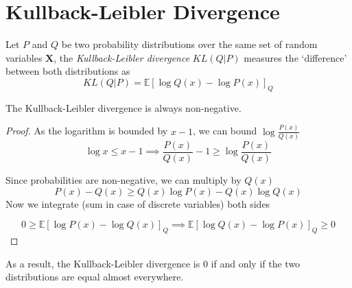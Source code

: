\section{Kullback-Leibler Divergence}

\begin{definition}
  Let \(P\) and \(Q\) be two probability distributions over the same set of
  random variables \(\bm{X}\), the \emph{Kullback-Leibler divergence}
  \(KL(Q|P)\) measures the `difference' between both distributions as
  \[
    KL(Q|P) = \mathbb{E}[\log Q(x) - \log P(x)]_Q
  \]
\end{definition}

\begin{proposition}
The Kullback-Leibler divergence is always non-negative.
\end{proposition}
\begin{proof}
  As the logarithm is bounded by \(x - 1\), we can bound \(\log{\frac{P(x)}{Q(x)}}\)
  \[
    \log{x} \leq x - 1 \implies \frac{P(x)}{Q(x)} - 1 \geq \log{\frac{P(x)}{Q(x)}}
  \]

  Since probabilities are non-negative, we can multiply by \(Q(x)\)
  \[
    P(x) - Q(x) \geq Q(x) \log{P(x)} - Q(x) \log{Q(x)}
  \]
  Now we integrate (sum in case of discrete variables) both sides

  \[
    0 \geq \mathbb{E}[\log{P(x)} - \log{Q(x)}]_Q \implies \mathbb{E}[\log{Q(x)}
    - \log{P(x)}]_Q \geq 0
  \]
\end{proof}
As a result, the Kullback-Leibler divergence is \(0\) if and only if the two
distributions are equal almost everywhere.

